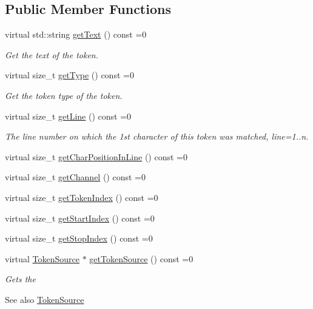 \subsection*{Public Member Functions}
\begin{DoxyCompactItemize}
\item 
\mbox{\label{classantlr4_1_1Token_ae288d9f2d72d0209a24e0cc5215e8844}} 
virtual std\+::string \hyperlink{classantlr4_1_1Token_ae288d9f2d72d0209a24e0cc5215e8844}{get\+Text} () const =0
\begin{DoxyCompactList}\small\item\em Get the text of the token. \end{DoxyCompactList}\item 
\mbox{\label{classantlr4_1_1Token_a518342431db9dd9d982880a59ef0e4f4}} 
virtual size\+\_\+t \hyperlink{classantlr4_1_1Token_a518342431db9dd9d982880a59ef0e4f4}{get\+Type} () const =0
\begin{DoxyCompactList}\small\item\em Get the token type of the token. \end{DoxyCompactList}\item 
\mbox{\label{classantlr4_1_1Token_a0820632f5ff92138362cba4c41293df0}} 
virtual size\+\_\+t \hyperlink{classantlr4_1_1Token_a0820632f5ff92138362cba4c41293df0}{get\+Line} () const =0
\begin{DoxyCompactList}\small\item\em The line number on which the 1st character of this token was matched, line=1..n. \end{DoxyCompactList}\item 
virtual size\+\_\+t \hyperlink{classantlr4_1_1Token_af4e82682816ba4166068e5b525dee31d}{get\+Char\+Position\+In\+Line} () const =0
\item 
virtual size\+\_\+t \hyperlink{classantlr4_1_1Token_a92991c0566e4cb00ae2c5f9e7d8fe6b4}{get\+Channel} () const =0
\item 
virtual size\+\_\+t \hyperlink{classantlr4_1_1Token_aaa5bda604b301abc3a84bc0f477750d5}{get\+Token\+Index} () const =0
\item 
virtual size\+\_\+t \hyperlink{classantlr4_1_1Token_ab0baee45182ad985ba4a61e4a46ffe6a}{get\+Start\+Index} () const =0
\item 
virtual size\+\_\+t \hyperlink{classantlr4_1_1Token_a813d966d66613c76f6af1e843a4b3359}{get\+Stop\+Index} () const =0
\item 
\mbox{\label{classantlr4_1_1Token_ad557fbfa499a36703b427b3f5f35baeb}} 
virtual \hyperlink{classantlr4_1_1TokenSource}{Token\+Source} $\ast$ \hyperlink{classantlr4_1_1Token_ad557fbfa499a36703b427b3f5f35baeb}{get\+Token\+Source} () const =0
\begin{DoxyCompactList}\small\item\em Gets the \begin{DoxySeeAlso}{See also}
\hyperlink{classantlr4_1_1TokenSource}{Token\+Source}



\end{DoxySeeAlso}
\end{DoxyCompactList}
\end{DoxyCompactItemize}
